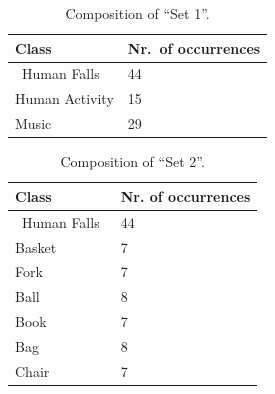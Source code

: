 \begin{table}[t]
	\centering

	\caption{Composition  of ``Set 1''.}
	\label{tab:set1Composition} %
	\begin{center}
		\begin{tabular}{K{3cm}K{3cm}}				
			\hline
			\textbf{Class} & \textbf{Nr.\ of occurrences} \\ 
			\hline
			$\,$ Human Falls $\,$ 	& 44    			\\
			Human Activity  		& 15		\\
			Music			  		& 29		\\
			\hline
		\end{tabular}			
	\end{center}		

\end{table}

\begin{table}[t]
	\centering
		
	\caption{Composition  of ``Set 2''.}
	\label{tab:set2Composition}
	\begin{center}
		
		\begin{tabular}{K{3cm}K{3cm}}
			
			\hline
			\textbf{Class} & \textbf{Nr. of occurrences} \\ 
			\hline
			$\,$ Human Falls $\,$ 	& 44    		\\				
			Basket      			& 7           	 \\
			Fork        			& 7           	 \\
			Ball       			& 8           	 \\
			Book        			& 7          	  \\
			Bag         			& 8          	  \\
			Chair       			& 7    			\\
			
			\hline
		\end{tabular}
		
	\end{center}
	
\end{table}


